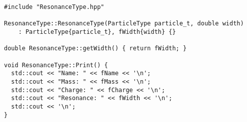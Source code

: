 \begin{lstlisting}
#include "ResonanceType.hpp"

ResonanceType::ResonanceType(ParticleType particle_t, double width)
    : ParticleType{particle_t}, fWidth{width} {}

double ResonanceType::getWidth() { return fWidth; }

void ResonanceType::Print() {
  std::cout << "Name: " << fName << '\n';
  std::cout << "Mass: " << fMass << '\n';
  std::cout << "Charge: " << fCharge << '\n';
  std::cout << "Resonance: " << fWidth << '\n';
  std::cout << '\n';
}
\end{lstlisting}